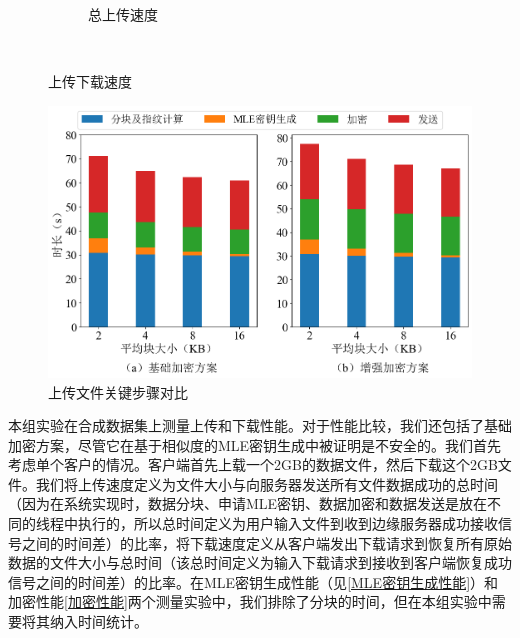 \documentclass[promaster]{thesis-uestc}
\begin{document}
\begin{figure}[h]
\begin{subfigure}{0.40\textwidth}
        \centering
        \captionsetup{width=\textwidth}
        \caption{总上传速度}
        \label{上传下载速度4}
    \end{subfigure}\\
    \caption{上传下载速度}
    \label{上传下载速度}
\end{figure}

\begin{figure}[ht]
    \centering
    \includegraphics[width = 0.90\linewidth]{pic/basic_enhanced_ratio.png}
    \caption{上传文件关键步骤对比}
    \label{上传文件关键步骤对比}
\end{figure}
本组实验在合成数据集上测量上传和下载性能。对于性能比较，我们还包括了基础加密方案，尽管它在基于相似度的MLE密钥生成中被证明是不安全的。我们首先考虑单个客户的情况。客户端首先上载一个2GB的数据文件，然后下载这个2GB文件。我们将上传速度定义为文件大小与向服务器发送所有文件数据成功的总时间（因为在系统实现时，数据分块、申请MLE密钥、数据加密和数据发送是放在不同的线程中执行的，所以总时间定义为用户输入文件到收到边缘服务器成功接收信号之间的时间差）的比率，将下载速度定义从客户端发出下载请求到恢复所有原始数据的文件大小与总时间（该总时间定义为输入下载请求到接收到客户端恢复成功信号之间的时间差）的比率。在MLE密钥生成性能（见\ref{MLE密钥生成性能}）和加密性能\ref{加密性能}两个测量实验中，我们排除了分块的时间，但在本组实验中需要将其纳入时间统计。
\end{document}
